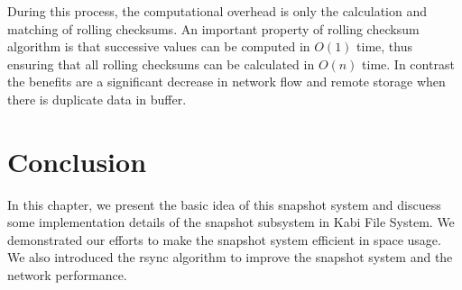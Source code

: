     During this process, the computational overhead is only the calculation and matching of rolling checksums. An important property of rolling checksum algorithm is that successive values can be computed in $O(1)$ time, thus ensuring that all rolling checksums can be calculated in $O(n)$ time. In contrast the benefits are a significant decrease in network flow and remote storage when there is duplicate data in buffer.

\section{Conclusion}

   In this chapter, we present the basic idea of this snapshot system and discuess some implementation details of the snapshot subsystem in Kabi File System. We demonstrated our efforts to make the snapshot system efficient in space usage. We also introduced the rsync algorithm to improve the snapshot system and the network performance.
